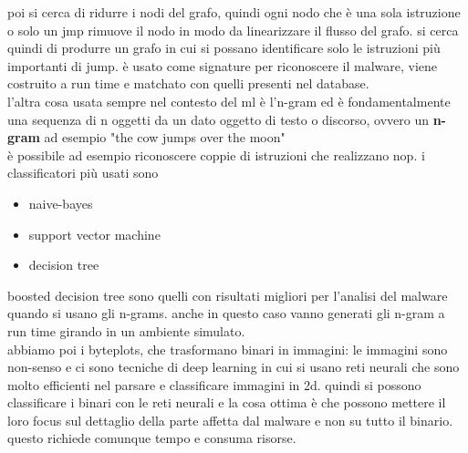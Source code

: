 \documentclass[12pt, oneside]{extbook} %
\begin{document}
poi si cerca di ridurre i nodi del grafo, quindi ogni nodo che è una sola istruzione o solo un jmp rimuove il nodo in modo da linearizzare il flusso del grafo. si cerca quindi di produrre un grafo in cui si possano identificare solo le istruzioni più importanti di jump. è usato come signature per riconoscere il malware, viene costruito a run time e matchato con quelli presenti nel database.\\l'altra cosa usata sempre nel contesto del ml è l'n-gram ed è fondamentalmente una sequenza di n oggetti da un dato oggetto di testo o discorso, ovvero un \textbf{n-gram} ad esempio "the cow jumps over the moon"\\è possibile ad esempio  riconoscere coppie di istruzioni che realizzano nop. i classificatori più usati sono
\begin{itemize}
	\item naive-bayes
	\item support vector machine
	\item decision tree
\end{itemize}
boosted decision tree sono quelli con risultati migliori per l'analisi del malware quando si usano gli n-grams. anche in questo caso vanno generati gli n-gram a run time girando in un ambiente simulato.\\abbiamo poi i byteplots, che trasformano binari in immagini: le immagini sono non-senso e ci sono tecniche di deep learning in cui si usano reti neurali che sono molto efficienti nel parsare e classificare immagini in 2d. quindi si possono classificare i binari con le reti neurali e la cosa ottima è che possono mettere il loro focus sul dettaglio della parte affetta dal malware e non su tutto il binario. questo richiede comunque tempo e consuma risorse.
\end{document}
